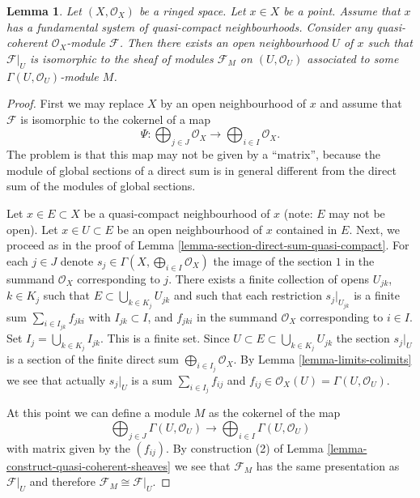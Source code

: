 \documentclass{stacks-project}
\theoremstyle{plain}
\newtheorem{lemma}[subsection]{Lemma}
\theoremstyle{definition}
\theoremstyle{remark}
\numberwithin{equation}{subsection}
\begin{document}
\begin{lemma}
\label{lemma-quasi-coherent-module}
Let $(X, \mathcal{O}_X)$ be a ringed space.
Let $x \in X$ be a point.
Assume that $x$ has a fundamental system of quasi-compact neighbourhoods.
Consider any quasi-coherent $\mathcal{O}_X$-module $\mathcal{F}$.
Then there exists an open neighbourhood $U$ of $x$
such that $\mathcal{F}|_U$ is isomorphic to the
sheaf of modules $\mathcal{F}_M$ on $(U, \mathcal{O}_U)$
associated to some $\Gamma(U, \mathcal{O}_U)$-module $M$.
\end{lemma}

\begin{proof}
First we may replace $X$ by an open neighbourhood of $x$
and assume that $\mathcal{F}$ is isomorphic to the
cokernel of a map
$$
\Psi :
\bigoplus\nolimits_{j \in J}
\mathcal{O}_X
\longrightarrow
\bigoplus\nolimits_{i \in I}
\mathcal{O}_X.
$$
The problem is that this map may not be given by
a ``matrix'', because the module of global sections of a direct sum
is in general different from the direct sum of the modules
of global sections.

\medskip\noindent
Let $x \in E \subset X$ be a quasi-compact
neighbourhood of $x$ (note: $E$ may not be open).
Let $x \in U \subset E$ be an open neighbourhood of
$x$ contained in $E$.
Next, we proceed as in the proof of
Lemma \ref{lemma-section-direct-sum-quasi-compact}.
For each $j \in J$ denote
$s_j \in \Gamma(X, \bigoplus\nolimits_{i \in I} \mathcal{O}_X)$
the image of the section $1$ in the summand $\mathcal{O}_X$
corresponding to $j$. There exists a finite collection of opens
$U_{jk}$, $k \in K_j$ such that $E \subset \bigcup_{k \in K_j} U_{jk}$
and such that each restriction $s_j|_{U_{jk}}$
is a finite sum $\sum_{i \in I_{jk}} f_{jki}$
with $I_{jk} \subset I$, and $f_{jki}$ in the summand
$\mathcal{O}_X$ corresponding to $i \in I$. Set
$I_j = \bigcup_{k \in K_j} I_{jk}$. This is a finite set.
Since $U \subset E \subset \bigcup_{k \in K_j} U_{jk}$
the section $s_j|_U$ is a section of the finite direct sum
$\bigoplus_{i \in I_j} \mathcal{O}_X$.
By Lemma \ref{lemma-limits-colimits}
we see that actually $s_j|_U$ is a sum
$\sum_{i \in I_j} f_{ij}$ and
$f_{ij} \in \mathcal{O}_X(U) = \Gamma(U, \mathcal{O}_U)$.

\medskip\noindent
At this point we can define a module $M$ as the cokernel of the map
$$
\bigoplus\nolimits_{j \in J}
\Gamma(U, \mathcal{O}_U)
\longrightarrow
\bigoplus\nolimits_{i \in I}
\Gamma(U, \mathcal{O}_U)
$$
with matrix given by the $(f_{ij})$. By construction (2) of
Lemma \ref{lemma-construct-quasi-coherent-sheaves} we see that
$\mathcal{F}_M$ has the same presentation as $\mathcal{F}|_U$
and therefore $\mathcal{F}_M \cong \mathcal{F}|_U$.
\end{proof}
\end{document}
